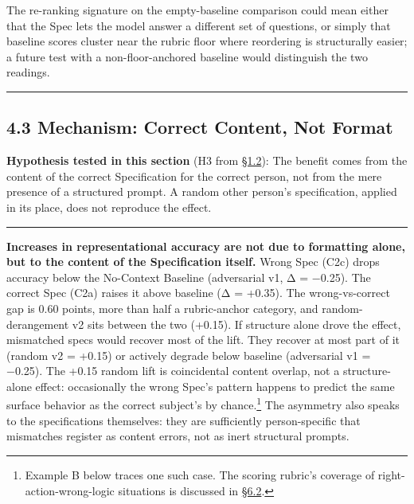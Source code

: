 The re-ranking signature on the empty-baseline comparison could mean
either that the Spec lets the model answer a different set of questions,
or simply that baseline scores cluster near the rubric floor where
reordering is structurally easier; a future test with a
non-floor-anchored baseline would distinguish the two readings.

\begin{center}\rule{0.5\linewidth}{0.5pt}\end{center}

\hypertarget{mechanism-correct-content-not-format}{%
\subsection{4.3 Mechanism: Correct Content, Not
Format}\label{mechanism-correct-content-not-format}}

\textbf{Hypothesis tested in this section} (H3 from \hyperref[what-we-tested]{§1.2}): The benefit
comes from the content of the correct Specification for the correct
person, not from the mere presence of a structured prompt. A random
other person's specification, applied in its place, does not reproduce
the effect.

\begin{center}\rule{0.5\linewidth}{0.5pt}\end{center}

\textbf{Increases in representational accuracy are not due to formatting
alone, but to the content of the Specification itself.} Wrong Spec (C2c)
drops accuracy below the No-Context Baseline (adversarial v1, Δ =
−0.25). The correct Spec (C2a) raises it above baseline (Δ = +0.35). The
wrong-vs-correct gap is 0.60 points, more than half a rubric-anchor
category, and random-derangement v2 sits between the two (+0.15). If
structure alone drove the effect, mismatched specs would recover most of
the lift. They recover at most part of it (random v2 = +0.15) or
actively degrade below baseline (adversarial v1 = −0.25). The +0.15
random lift is coincidental content overlap, not a structure-alone
effect: occasionally the wrong Spec's pattern happens to predict the
same surface behavior as the correct subject's by chance.\footnote{Example
  B below traces one such case. The scoring rubric's coverage of
  right-action-wrong-logic situations is discussed in \hyperref[measurement-apparatus]{§6.2}.} The
asymmetry also speaks to the specifications themselves: they are
sufficiently person-specific that mismatches register as content errors,
not as inert structural prompts.

